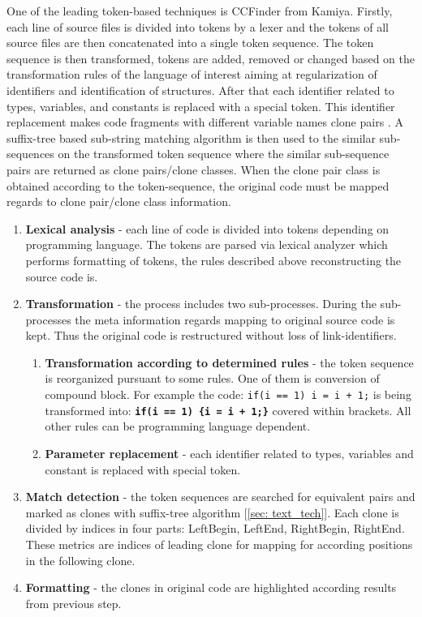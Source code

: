 \documentclass{report}
\begin{document}
One of the leading token-based techniques is CCFinder from Kamiya\cite{tocken_kamiya}. Firstly, each line of source files is divided into tokens by a lexer and the tokens of all source files are then concatenated into a single token sequence. The token sequence is then transformed, tokens are added, removed or changed based on the transformation rules of the language of interest aiming at regularization of identifiers and identification of structures. 
After that each identifier related to types, variables, and constants is replaced with a special token\cite{tocken_kamiya}. This identifier replacement makes code fragments with different variable names clone pairs \cite{tocken_kamiya}. A suffix-tree based sub-string matching algorithm is then used 
to the similar sub-sequences on the transformed token sequence where the similar sub-sequence pairs are returned as clone pairs/clone classes\cite{tocken_kamiya}. When the clone pair class is obtained according to the token-sequence, the original code must be mapped regards to clone pair/clone class information.
\\
\begin{enumerate}
  \item \textbf{Lexical analysis} - each line of code is divided into tokens depending on programming language. The tokens are parsed via lexical analyzer which performs formatting of tokens, the rules described above reconstructing the source code is.
\item \textbf{Transformation}  - the process includes two sub-processes. During the sub-processes the meta information regards mapping to original source code is kept. Thus the original code is restructured without loss of link-identifiers.
  \begin{enumerate}[label*=\arabic*.]
    \item \textbf{Transformation according to determined rules} - the token sequence is reorganized pursuant to some rules. One of them is conversion of compound block. For example the code: \texttt{if(i == 1) i = i + 1;} is being transformed into: \texttt{\textbf{if(i == 1) \{i = i + 1;\}}} covered within brackets. All other rules can be programming language dependent.
    \item \textbf{Parameter replacement} - each identifier related to types, variables and constant is replaced with special token\cite{tocken_kamiya}.
  \end{enumerate} 
  \item\textbf{Match detection} - the token sequences are searched for equivalent pairs and marked as clones with suffix-tree algorithm [\ref{sec: text_tech}]. Each clone is divided by indices in four parts: LeftBegin, LeftEnd, RightBegin, RightEnd. These metrics are indices of leading clone for mapping for according positions in the following clone.
  \item\textbf{Formatting} - the clones in original code are highlighted according results from previous step.
\end{enumerate}
\end{document}
